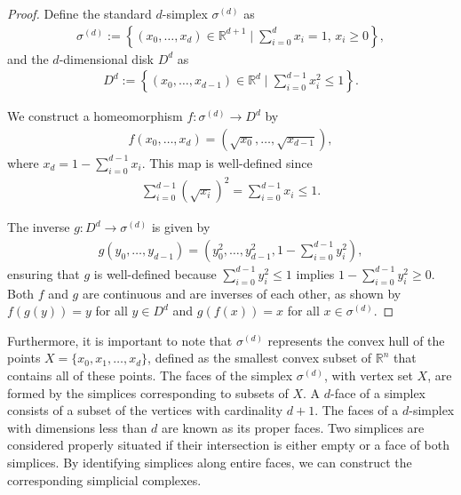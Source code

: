 \begin{proof}
Define the standard \( d \)-simplex \( \sigma^{(d)} \) as
\begin{align}
\sigma^{(d)} := \left\{(x_{0}, \ldots, x_{d}) \in \mathbb{R}^{d+1} \mid \sum_{i=0}^{d} x_{i} = 1, \, x_{i} \geq 0\right\},
\end{align}
and the \( d \)-dimensional disk \( D^{d} \) as
\begin{align}
D^{d} := \left\{(x_{0}, \ldots, x_{d-1}) \in \mathbb{R}^{d} \mid \sum_{i=0}^{d-1} x_{i}^{2} \leq 1\right\}.
\end{align}

We construct a homeomorphism \( f: \sigma^{(d)} \rightarrow D^{d} \) by
\begin{align}
f(x_{0}, \ldots, x_{d}) = (\sqrt{x_{0}}, \ldots, \sqrt{x_{d-1}}),
\end{align}
where \( x_{d} = 1 - \sum_{i=0}^{d-1} x_{i} \). This map is well-defined since
\begin{align}
\sum_{i=0}^{d-1} (\sqrt{x_{i}})^{2} = \sum_{i=0}^{d-1} x_{i} \leq 1.
\end{align}

The inverse \( g: D^{d} \rightarrow \sigma^{(d)} \) is given by
\begin{align}
g(y_{0}, \ldots, y_{d-1}) = (y_{0}^{2}, \ldots, y_{d-1}^{2}, 1 - \sum_{i=0}^{d-1} y_{i}^{2}),
\end{align}
ensuring that \( g \) is well-defined because \( \sum_{i=0}^{d-1} y_{i}^{2} \leq 1 \) implies
\( 1 - \sum_{i=0}^{d-1} y_{i}^{2} \geq 0 \). Both \( f \) and \( g \) are continuous and are inverses of each other, as shown by
\( f(g(y)) = y \) for all \( y \in D^{d} \) and \( g(f(x)) = x \) for all
\( x \in \sigma^{(d)} \).
\end{proof}

Furthermore, it is important to note that $\sigma^{(d)}$ represents the convex hull
of the points $X = \{x_{0}, x_{1}, \ldots, x_{d}\}$, defined as the smallest convex
subset of $\mathbb{R}^{n}$ that contains all of these points. The faces of the
simplex $\sigma^{(d)}$, with vertex set $X$, are formed by the simplices
corresponding to subsets of $X$. A $d$-face of a simplex consists of a subset of
the vertices with cardinality $d+1$. The faces of a $d$-simplex with dimensions
less than $d$ are known as its proper faces. Two simplices
are considered properly situated if their intersection is
either empty or a face of both simplices. By identifying simplices along entire
faces, we can construct the corresponding simplicial complexes.

